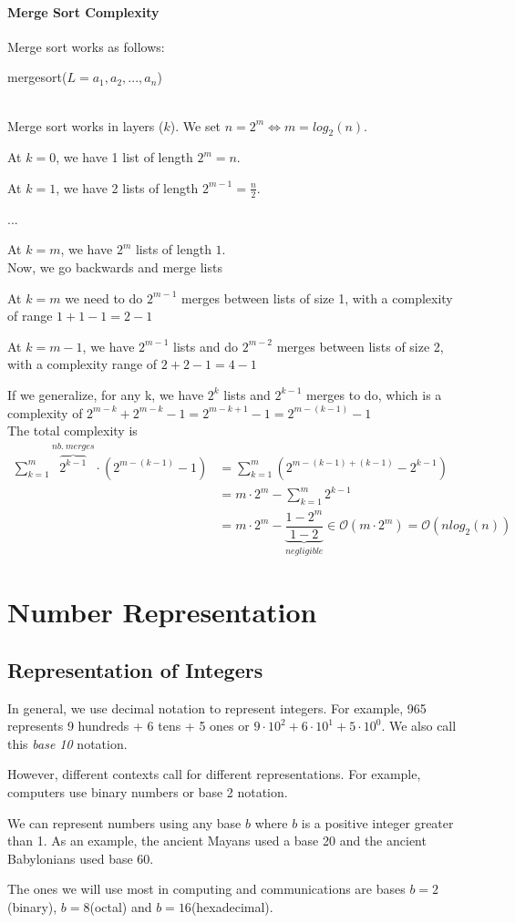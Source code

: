 \documentclass[10pt,a4paper]{book}
\begin{document}
\paragraph{Merge Sort Complexity}
Merge sort works as follows:\\
\begin{procedure}
\caption{mergesort($L=a_1,a_2,...,a_n$)}
\DontPrintSemicolon
\SetAlgoNoEnd
{}
\end{procedure}\\
Merge sort works in layers ($k$). We set $n=2^m \Leftrightarrow m=log_2(n)$.\par 
At $k=0$, we have 1 list of length $2^m=n$.\par 
At $k=1$, we have 2 lists of length $2^{m-1}=\frac{n}{2}$.\par
...\par
At $k=m$, we have $2^m$ lists of length $1$. \\
Now, we go backwards and merge lists\par
At $k=m$ we need to do $2^{m-1}$ merges between lists of size 1, with a complexity of range $1+1-1=2-1$\par 
At $k=m-1$, we have $2^{m-1}$ lists and do $2^{m-2}$ merges between lists of size 2, with a complexity range of $2+2-1=4-1$\par 
If we generalize, for any k, we have $2^k$ lists and $2^{k-1}$ merges to do, which is a complexity of $2^{m-k} + 2^{m-k} -1 = 2^{m-k+1} -1 = 2^{m-(k-1)} -1$\\
The total complexity is 
\begin{align*}
\sum_{k=1}^{m} \overbrace{2^{k-1}}^{nb.\ merges} \cdot (2^{m-(k-1)} -1) &= \sum_{k=1}^m (2^{m-(k-1)+(k-1)}-2^{k-1})\\
&= m\cdot 2^m - \sum_{k=1}^{m} 2^{k-1}\\
&= m\cdot 2^m - \underbrace{\dfrac{1-2^m}{1-2}}_{negligible} \in \mathcal{O}(m\cdot 2^m) = \mathcal{O}(nlog_2(n))
\end{align*}

\section{Number Representation}
\subsection{Representation of Integers}
In general, we use decimal notation to represent integers. For example, 965 represents 9 hundreds + 6 tens + 5 ones or $9\cdot 10^2+6\cdot 10^1+5\cdot 10^0$. We also call this \textit{base 10} notation.\par 
However, different contexts call for different representations. For example, computers use binary numbers or base 2 notation.\par 
We can represent numbers using any base $b$ where $b$ is a positive integer greater than 1. As an example, the ancient Mayans used a base 20 and the ancient Babylonians used base 60.\par 
The ones we will use most in computing and communications are bases $b=2$(binary), $b=8$(octal) and $b=16$(hexadecimal).
\end{document}
